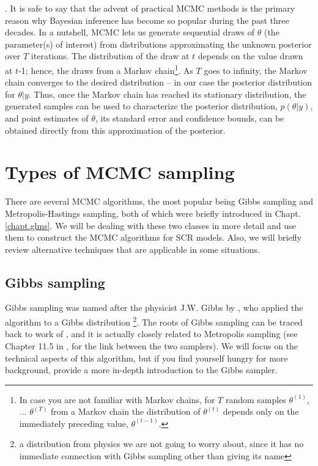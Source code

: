 \citep{gelfand_smith:1990}. It is safe to say that the advent of
practical MCMC methods is the primary reason why Bayesian inference
has become so popular during the past three decades.
In a nutshell, MCMC lets us generate sequential draws of $\theta$ (the
parameter(s) of interest) from distributions approximating the unknown
posterior over $T$ iterations. The distribution of the draw at $t$ depends
on the value drawn at $t$-1; hence, the draws from a Markov
chain\footnote{In case you are not familiar with Markov chains, for
  $T$ random samples $\theta^ {(1)}$, ... $\theta^{(T)}$ from a Markov chain
  the distribution of $\theta^{(t)}$ depends only on the immediately preceding
  value, $\theta^{(t-1)}$.}. As $T$ goes to infinity, the Markov chain
converges to the desired distribution – in our case the posterior
distribution for $\theta|y$. Thus, once the Markov chain has reached
its stationary distribution, the generated samples can be used to
characterize the posterior distribution, $p(\theta|y)$, and point
estimates of $\theta$, its standard error and confidence bounds, can
be obtained directly from this approximation of the posterior. 



\section{Types of MCMC sampling}

There are several MCMC algorithms, the most popular being Gibbs
sampling and Metropolis-Hastings sampling, both of which were briefly introduced in Chapt. \ref{chapt.glms}. We will be dealing with
these two classes in more detail and use them to construct the MCMC
algorithms for SCR models. Also, we will briefly review alternative
techniques that are applicable in some situations.


\subsection{Gibbs sampling}

Gibbs sampling was named after the physicist J.W. Gibbs by
\citet{geman_geman:1984}, who applied the algorithm to a Gibbs
distribution \footnote{a distribution from physics we are not going to
  worry about, since it has no immediate connection with Gibbs
  sampling other than giving its name}. The roots of Gibbs sampling
can be traced back to work of \citet{metropolis_ulam:1953}, and it is
actually closely related to Metropolis sampling (see Chapter 11.5 in
\citet{gelman_etal:2004}, for the link between the two samplers). We
will focus on the technical aspects of this algorithm, but if you find
yourself hungry for more background, \citet{casella_george:1992}
provide a more in-depth introduction to the Gibbs sampler.

